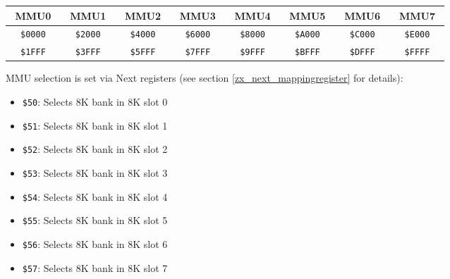 \documentclass[oneside,a4paper]{book}
\newcommand{\notet}{\rule{0pt}{2.4ex}}
\newcommand{\noteb}{\rule[-1.3ex]{0pt}{0pt}}
\begin{document}
\begingroup
	\setlength{\tabcolsep}{1pt}
	\begin{tabular}{|cccc|cccc|cccc|cccc|cccc|cccc|cccc|cccc|}
		\hline
		\multicolumn{4}{|c}{MMU0}\notet\noteb & 
			\multicolumn{4}{|c}{MMU1} & 
			\multicolumn{4}{|c}{MMU2} & 
			\multicolumn{4}{|c}{MMU3} & 
			\multicolumn{4}{|c}{MMU4} & 
			\multicolumn{4}{|c}{MMU5} & 
			\multicolumn{4}{|c}{MMU6} & 
			\multicolumn{4}{|c|}{MMU7} \\
		\hline
		\colnoline{$\leftarrow$}\notet & \multicolumn{2}{c}{\tt \$0000} & \colnoline{} &
			\colnoline{$\leftarrow$}\notet & \multicolumn{2}{c}{\tt \$2000} & \colnoline{} &
			\colnoline{$\leftarrow$}\notet & \multicolumn{2}{c}{\tt \$4000} & \colnoline{} &
			\colnoline{$\leftarrow$}\notet & \multicolumn{2}{c}{\tt \$6000} & \colnoline{} &
			\colnoline{$\leftarrow$}\notet & \multicolumn{2}{c}{\tt \$8000} & \colnoline{} &
			\colnoline{$\leftarrow$}\notet & \multicolumn{2}{c}{\tt \$A000} & \colnoline{} &
			\colnoline{$\leftarrow$}\notet & \multicolumn{2}{c}{\tt \$C000} & \colnoline{} &
			\colnoline{$\leftarrow$}\notet & \multicolumn{2}{c}{\tt \$E000} & \colnoline{} \\
		\colnoline{} & \multicolumn{2}{c}{\tt \$1FFF} & \colnoline{$\rightarrow$} &
			\colnoline{} & \multicolumn{2}{c}{\tt \$3FFF} & \colnoline{$\rightarrow$} &
			\colnoline{} & \multicolumn{2}{c}{\tt \$5FFF} & \colnoline{$\rightarrow$} &
			\colnoline{} & \multicolumn{2}{c}{\tt \$7FFF} & \colnoline{$\rightarrow$} &
			\colnoline{} & \multicolumn{2}{c}{\tt \$9FFF} & \colnoline{$\rightarrow$} &
			\colnoline{} & \multicolumn{2}{c}{\tt \$BFFF} & \colnoline{$\rightarrow$} &
			\colnoline{} & \multicolumn{2}{c}{\tt \$DFFF} & \colnoline{$\rightarrow$} &
			\colnoline{} & \multicolumn{2}{c}{\tt \$FFFF} & \colnoline{$\rightarrow$} \\
	\end{tabular}
\endgroup

MMU selection is set via Next registers (see section \ref{zx_next_mappingregister} for details):

\begin{itemize}
	\item {\tt \$50}: Selects 8K bank in 8K slot 0
	\item {\tt \$51}: Selects 8K bank in 8K slot 1
	\item {\tt \$52}: Selects 8K bank in 8K slot 2
	\item {\tt \$53}: Selects 8K bank in 8K slot 3
	\item {\tt \$54}: Selects 8K bank in 8K slot 4
	\item {\tt \$55}: Selects 8K bank in 8K slot 5
	\item {\tt \$56}: Selects 8K bank in 8K slot 6
	\item {\tt \$57}: Selects 8K bank in 8K slot 7
\end{itemize}
\end{document}
